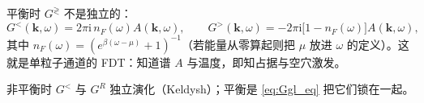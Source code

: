 平衡时 $G^{\gtrless}$ 不是独立的：
\begin{equation}
  G^<(\mathbf{k},\omega)
  =2\pi\mathrm{i}\,n_F(\omega)A(\mathbf{k},\omega),
  \qquad
  G^>(\mathbf{k},\omega)
  =-2\pi\mathrm{i}\bigl[1-n_F(\omega)\bigr]A(\mathbf{k},\omega),
\label{eq:Ggl_eq}
\end{equation}
其中 $n_F(\omega)=(e^{\beta(\omega-\mu)}+1)^{-1}$（若能量从零算起则把 $\mu$ 放进 $\omega$ 的定义）。这就是单粒子通道的 FDT：知道谱 $A$ 与温度，即知占据与空穴激发。

\begin{note}
非平衡时 $G^<$ 与 $G^R$ 独立演化（Keldysh）；平衡是 \eqref{eq:Ggl_eq} 把它们锁在一起。
\end{note}
